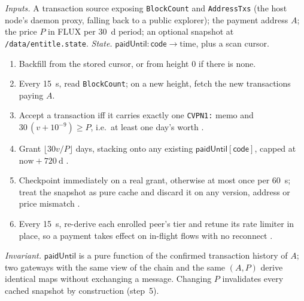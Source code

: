 \begin{construction}
\label{alg:cvpn}
\emph{Inputs.} A transaction source exposing \texttt{BlockCount} and \texttt{AddressTxs} (the host
node's daemon proxy, falling back to a public explorer); the payment address $A$; the price $P$ in
FLUX per \qty{30}{\day} period; an optional snapshot at \texttt{/\allowbreak{}data/\allowbreak{}entitle.\allowbreak{}state}.\quad
\emph{State.} $\mathsf{paidUntil} : \mathsf{code} \to \text{time}$, plus a scan cursor.
\begin{enumerate}\setlength{\itemsep}{1pt}
\item Backfill from the stored cursor, or from height $0$ if there is none.
\item Every \qty{15}{\second}, read \texttt{BlockCount}; on a new height, fetch the new transactions
      paying $A$.
\item Accept a transaction iff it carries exactly one \texttt{CVPN1:} memo and
      $30\,(v + 10^{-9}) \ge P$, i.e.\ at least one day's worth
      .
\item Grant $\lfloor 30 v / P \rfloor$ days, stacking onto any existing
      $\mathsf{paidUntil}[\mathsf{code}]$, capped at $\text{now} + \qty{720}{\day}$
      .
\item Checkpoint immediately on a real grant, otherwise at most once per \qty{60}{\second}; treat the
      snapshot as pure cache and discard it on any version, address or price mismatch
      .
\item Every \qty{15}{\second}, re-derive each enrolled peer's tier and retune its rate limiter in
      place, so a payment takes effect on in-flight flows with no reconnect
      .
\end{enumerate}
\emph{Invariant.} $\mathsf{paidUntil}$ is a pure function of the confirmed transaction history of $A$;
two gateways with the same view of the chain and the same $(A,P)$ derive identical maps without
exchanging a message. Changing $P$ invalidates every cached snapshot by construction (step~5).\quad

\end{construction}
